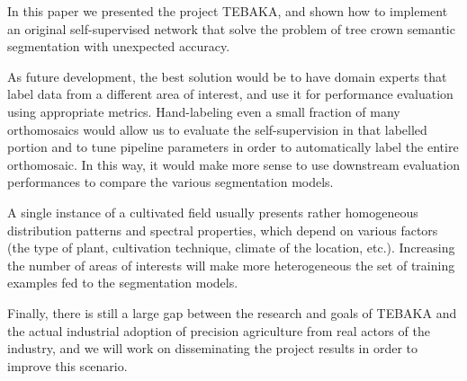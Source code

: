 \documentclass[comsoc,final]{IEEEtran}
\begin{document}
In this paper we presented the project TEBAKA, and shown how to implement an original self-supervised network that solve the problem of tree crown semantic segmentation with unexpected accuracy. 
 
 As future development, the best solution would be to have domain experts that label data from a different area of interest, and use it for performance evaluation using appropriate metrics. Hand-labeling even a small fraction of many orthomosaics would allow us to evaluate the self-supervision in that labelled portion and to tune pipeline parameters in order to automatically label the entire orthomosaic. In this way, it would make more sense to use downstream evaluation performances to compare the various segmentation models. 
 
 A single instance of a cultivated field usually presents rather homogeneous distribution patterns and spectral properties, which depend on various factors (the type of plant, cultivation technique, climate of the location, etc.). Increasing the number of areas of interests will make more heterogeneous the set of training examples fed to the segmentation models.

 Finally, there is still a large gap between the research and goals of TEBAKA and the actual industrial adoption of precision agriculture from real actors of the industry, and we will work on disseminating the project results in order to improve this scenario.

\printbibliography
\end{document}
